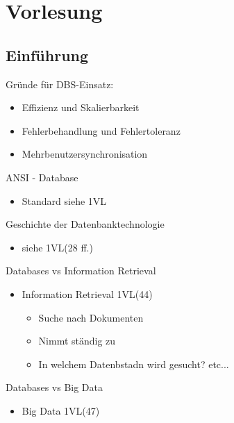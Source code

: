 
\chapter{Vorlesung}
\section{Einführung}

Gründe für DBS-Einsatz:
\begin{itemize}
\item Effizienz und Skalierbarkeit
\item Fehlerbehandlung und Fehlertoleranz
\item Mehrbenutzersynchronisation
\end{itemize}

ANSI - Database
\begin{itemize}
\item Standard siehe 1VL
\end{itemize}

Geschichte der Datenbanktechnologie
\begin{itemize}
\item siehe 1VL(28 ff.)
\end{itemize}


Databases vs Information Retrieval
\begin{itemize}
\item Information Retrieval 1VL(44)
\begin{itemize}
\item Suche nach Dokumenten
\item Nimmt ständig zu
\item In welchem Datenbstadn wird gesucht? etc...
\end{itemize}
\end{itemize}

Databases vs Big Data
\begin{itemize}
\item Big Data 1VL(47)
\end{itemize}
